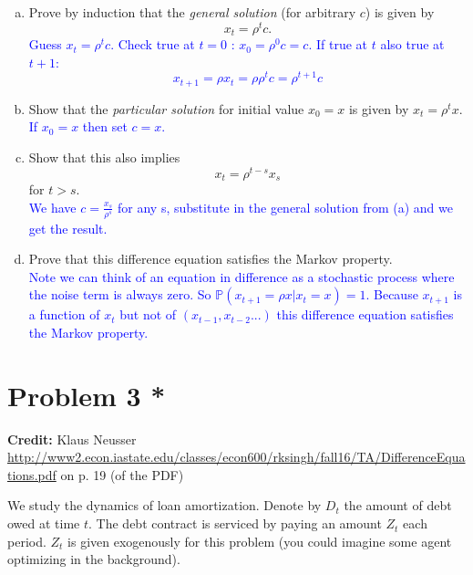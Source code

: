\documentclass[11pt]{extarticle}
\theoremstyle{plain}
\theoremstyle{definition}
\begin{document}
\begin{enumerate}[(a)]
\item Prove by induction that the \textit{general solution} (for arbitrary $c$) is given by
\begin{equation*}
	x_t = \rho^t c.
\end{equation*}
\textcolor{blue}{Guess $x_t=\rho^t c$. Check true at $t= 0$ : $x_0 = \rho^0c=c$. If true at $t$ also true at $t+1$: $$x_{t+1}=\rho x_t = \rho \rho^t c= \rho^{t+1}c$$}

\item Show that the \textit{particular solution} for initial value $x_0 = x$ is given by $x_t = \rho^t x$. 
\textcolor{blue}{If $x_0=x$ then set $c=x$.}

\item Show that this also implies 
\begin{equation*}
	x_t = \rho^{t-s} x_s
\end{equation*}
for $t > s$. \\
\textcolor{blue}{We have $c=\frac{x_s}{\rho^s}$ for any s, substitute in the general solution from (a) and we get the result.}

\item Prove that this difference equation satisfies the Markov property. \\
\textcolor{blue}{Note we can think of an equation in difference as a stochastic process where the noise term is always zero. So $\mathbb P (x_{t+1}=\rho x|x_t=x)=1$. Because $x_{t+1}$ is a function of $x_t$ but not of $(x_{t-1},x_{t-2}...)$ this difference equation satisfies the Markov property.}
\end{enumerate}



\vspace{10mm}
\section*{Problem 3 *}

\textbf{Credit:} Klaus Neusser \url{http://www2.econ.iastate.edu/classes/econ600/rksingh/fall16/TA/DifferenceEquations.pdf} on p. 19 (of the PDF)

\vspace{5mm}
\noindent
We study the dynamics of loan amortization. Denote by $D_t$ the amount of debt owed at time $t$. The debt contract is serviced by paying an amount $Z_t$ each period. $Z_t$ is given exogenously for this problem (you could imagine some agent optimizing in the background).
\end{document}
